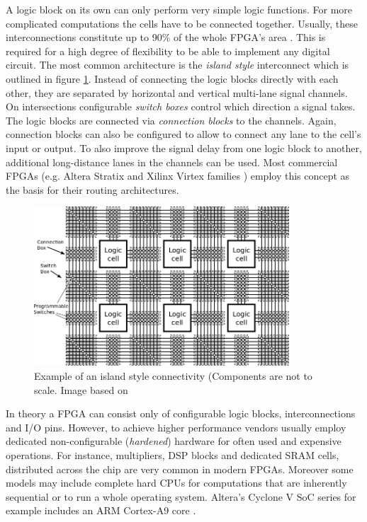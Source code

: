 
A logic block on its own can only perform very simple logic functions. For more complicated computations the
cells have to be connected together.
Usually, these interconnections constitute up to 90\% of the whole FPGA’s area \cite{farooq}.
This is required for a high degree of flexibility to be able to implement any digital circuit.
The most common architecture is the \emph{island style} interconnect \cite{hauck} which is outlined in figure \ref{fig:island}.
Instead of connecting the logic blocks directly with each other, they are separated by horizontal and vertical multi-lane signal channels.
On intersections configurable \emph{switch boxes} control which direction a signal takes.
The logic blocks are connected via \emph{connection blocks} to the channels.
Again, connection blocks can also be configured to allow to connect any lane to the cell’s input or output.
To also improve the signal delay from one logic block to another, additional long-distance lanes in the channels can be used.
Most commercial FPGAs (e.g. Altera Stratix and Xilinx Virtex families \cite{altera_arch}) employ this concept as the basis for their routing architectures.


\begin{figure}[htb]
	  \centerline{
		\includegraphics[width=0.85\textwidth]{images/island_style.png}}
	  \caption{Example of an island style connectivity (Components are not to scale. Image based on \cite{hauck}}
	  \label{fig:island}
\end{figure}


In theory a FPGA can consist only of configurable logic blocks, interconnections and I/O pins.
However, to achieve higher performance vendors usually employ dedicated non-configurable (\emph{hardened}) hardware for often used and expensive operations. 
For instance, multipliers, DSP blocks and dedicated SRAM cells, distributed across the chip are very common in modern FPGAs.
Moreover some models may include complete hard CPUs for computations that are inherently sequential or to run a whole operating system.
Altera’s Cyclone V SoC series for example includes an ARM Cortex-A9 core \cite{altera_arch}.


